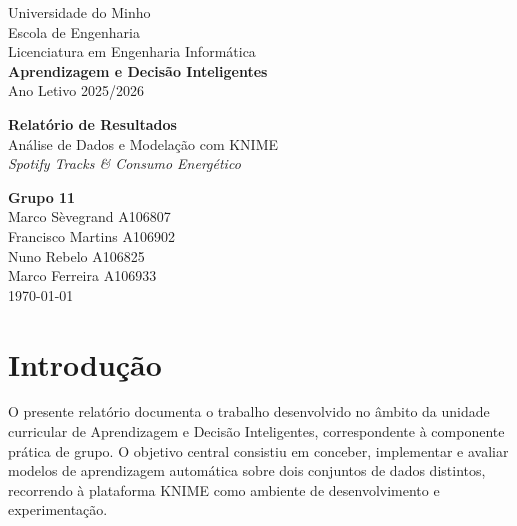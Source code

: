 \documentclass[11pt,a4paper]{article}
\begin{document}
\hypersetup{pageanchor=false}

\thispagestyle{empty}
\begin{titlepage}
\vspace*{2cm}
\begin{center}
{\Large Universidade do Minho}\\[2pt]
{\Large Escola de Engenharia}\\[4pt]
{\Large Licenciatura em Engenharia Informática}\\[8pt]
{\Large\textbf{Aprendizagem e Decisão Inteligentes}}\\[4pt]
{\large Ano Letivo 2025/2026}

\vspace*{4cm}

{\Huge\textbf{Relatório de Resultados}}\\[12pt]
{\LARGE Análise de Dados e Modelação com KNIME}\\[8pt]
{\large \textit{Spotify Tracks \& Consumo Energético}}

\vspace*{4cm}

{\Large\textbf{Grupo 11}}\\[16pt]
{\large Marco Sèvegrand \quad A106807}\\[4pt]
{\large Francisco Martins \quad A106902}\\[4pt]
{\large Nuno Rebelo \quad A106825}\\[4pt]
{\large Marco Ferreira \quad A106933}\\[24pt]
{\large \today}
\end{center}
\end{titlepage}

\hypersetup{linkcolor=black}
\tableofcontents
\hypersetup{linkcolor=blue}
\clearpage
\hypersetup{pageanchor=true}

\section{Introdução}

O presente relatório documenta o trabalho desenvolvido no âmbito da unidade curricular de Aprendizagem e Decisão Inteligentes, correspondente à componente prática de grupo. O objetivo central consistiu em conceber, implementar e avaliar modelos de aprendizagem automática sobre dois conjuntos de dados distintos, recorrendo à plataforma KNIME como ambiente de desenvolvimento e experimentação.
\end{document}
